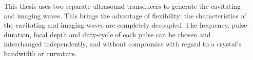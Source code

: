 



This thesis uses two separate ultrasound transducers to generate the cavitating and imaging waves.
This brings the advantage of flexibility:
the characteristics of the cavitating and imaging waves are completely decoupled.
The  frequency, pulse-duration, focal depth and duty-cycle of each pulse can be chosen and interchanged independently,
and without  compromise with regard to a crystal's bandwidth or curvature.

